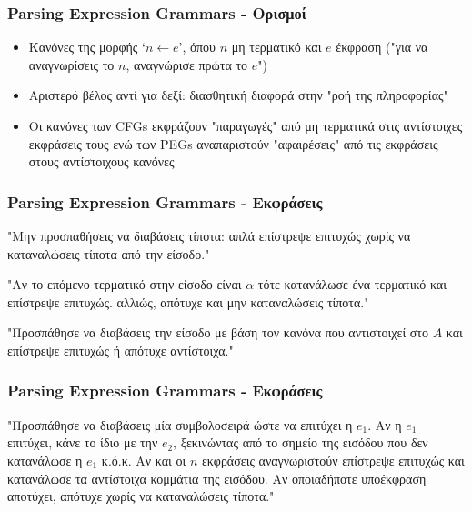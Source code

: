 \documentclass{beamer}
\begin{document}
\begin{frame}
  \frametitle{Parsing Expression Grammars - Ορισμοί}
  \begin{itemize}
	\item Κανόνες της μορφής `$ n \leftarrow e $', όπου $ n$ μη τερματικό και $e$ έκφραση ("για να αναγνωρίσεις το $n$, αναγνώρισε πρώτα το $e$") \pause
	  \item Αριστερό βέλος αντί για δεξί: διασθητική διαφορά στην "ροή της πληροφορίας" \pause
	  \item Oι κανόνες των CFGs εκφράζουν "παραγωγές" από μη τερματικά στις αντίστοιχες εκφράσεις τους ενώ των  PEGs αναπαριστούν "αφαιρέσεις" από τις εκφράσεις στους αντίστοιχους κανόνες
  \end{itemize}
  \end{frame}

\begin{frame}
  \frametitle{Parsing Expression Grammars - Εκφράσεις}

 \begin{description}[font=$\bullet$\scshape\bfseries]
   \item[Κενή συμβολοσειρά `()' :] "Μην προσπαθήσεις να διαβάσεις τίποτα: απλά επίστρεψε επιτυχώς χωρίς να καταναλώσεις τίποτα από την είσοδο." \pause

   \item[Τερματικό `$ \alpha$':] "Αν το επόμενο τερματικό στην είσοδο είναι $ \alpha $ τότε κατανάλωσε ένα τερματικό και επίστρεψε επιτυχώς. αλλιώς, απότυχε και μην καταναλώσεις τίποτα."\pause

   \item[Μη Τερματικό `$ A $':] "Προσπάθησε να διαβάσεις την είσοδο με βάση τον κανόνα που αντιστοιχεί στο  $ A $ και επίστρεψε επιτυχώς ή απότυχε αντίστοιχα."
  \end{description}
\end{frame}

\begin{frame}
  \frametitle{Parsing Expression Grammars - Εκφράσεις}

 \begin{description}[font=$\bullet$\scshape\bfseries]
   \item[Ακολουθία `$(e_1 e_2 \ldots e_n)$':] "Προσπάθησε να διαβάσεις μία συμβολοσειρά ώστε να επιτύχει η $e_1$. 
	 Αν η $ e_1$ επιτύχει, κάνε το ίδιο με την  $e_2$, ξεκινώντας από το σημείο της εισόδου που δεν κατανάλωσε η  $e_1$ κ.ό.κ. 
	 Αν και οι  $n$ εκφράσεις αναγνωριστούν επίστρεψε επιτυχώς και κατανάλωσε τα αντίστοιχα κομμάτια της εισόδου.
	 Αν οποιαδήποτε υποέκφραση αποτύχει, απότυχε χωρίς να καταναλώσεις τίποτα."

  \end{description}
\end{frame}
\end{document}
